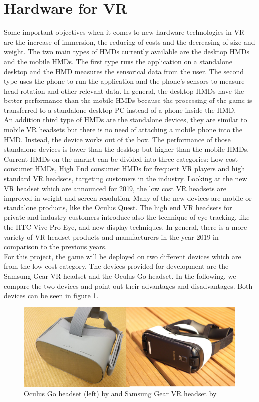 \section{Hardware for VR} \label{hardware}
Some important objectives when it comes to new hardware technologies in VR are the increase of immersion, the reducing of costs and the decreasing of size and weight. The two main types of HMDs currently available are the desktop HMDs and the mobile HMDs. The first type runs the application on a standalone desktop and the HMD measures the sensorical data from the user. The second type uses the phone to run the application and the phone's sensors to measure head rotation and other relevant data. In general, the desktop HMDs have the better performance than the mobile HMDs because the processing of the game is transferred to a standalone desktop PC instead of a phone inside the HMD. \cite{Dorner.2013}\\
An addition third type of HMDs are the standalone devices, they are similar to mobile VR headsets but there is no need of attaching a mobile phone into the HMD. Instead, the device works out of the box. The performance of those standalone devices is lower than the desktop but higher than the mobile HMDs. \cite{Vitillo}\\
Current HMDs on the market can be divided into three categories: Low cost consumer HMDs, High End consumer HMDs for frequent VR players and high standard VR headsets, targeting customers in the industry. Looking at the new VR headset which are announced for 2019, the low cost VR headsets are improved in weight and screen resolution. Many of the new devices are mobile or standalone products, like the Oculus Quest. The high end VR headsets for private and industry customers introduce also the technique of eye-tracking, like the HTC Vive Pro Eye, and new display techniques. In general, there is a more variety of VR headset products and manufacturers in the year 2019 in comparison to the previous years. \cite{Pertzborn.2019}\\
For this project, the game will be deployed on two different devices which are from the low cost category. The devices provided for development are the Samsung Gear VR headset and the Oculus Go headset. In the following, we compare the two devices and point out their advantages and disadvantages. Both devices can be seen in figure \ref{fig:devices}.


\begin{figure}[h!]
  \includegraphics[width=13cm]{kapitel/oculus-samsung}
  \centering
  \caption{Oculus Go headset (left) by \cite{oculus} and Samsung Gear VR headset by \cite{hmd1}}
  \label{fig:devices}
\end{figure}
\newpage 
